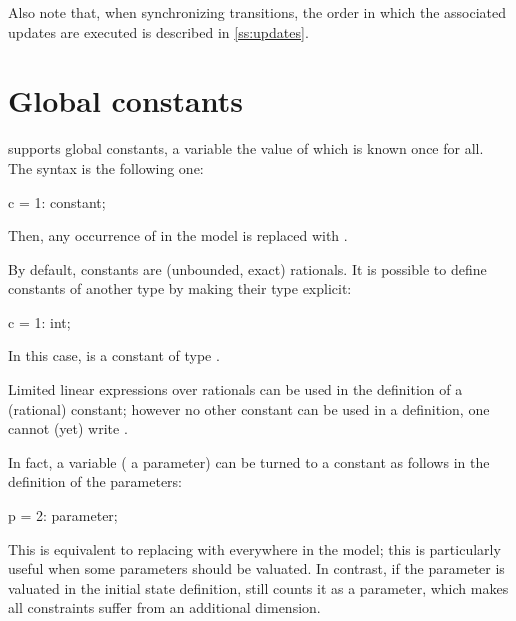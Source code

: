 Also note that, when synchronizing transitions, the order in which the associated updates are executed is described in \cref{ss:updates}.


\section{Global constants}

\imitator{} supports global constants, \ie{} a variable the value of which is known once for all.
The syntax is the following one:

\begin{IMITATORmodel}
c = 1: constant;
\end{IMITATORmodel}

Then, any occurrence of  in the model is replaced with .

By default, constants are (unbounded, exact) rationals.
It is possible to define constants of another type by making their type explicit:

\begin{IMITATORmodel}
c = 1: int;
\end{IMITATORmodel}

In this case,  is a constant of type .

Limited linear expressions over rationals can be used in the definition of a (rational) constant; however no other constant can be used in a definition, \ie{} one cannot (yet) write .


\begin{hint}
	In fact, a variable (\eg{} a parameter) can be turned to a constant as follows in the definition of the parameters:

\begin{IMITATORmodel}
p = 2: parameter;
\end{IMITATORmodel}

	This is equivalent to replacing  with  everywhere in the model; this is particularly useful when some parameters should be valuated.
	In contrast, if the parameter is valuated in the initial state definition, \imitator{} still counts it as a parameter, which makes all constraints suffer from an additional dimension.
\end{hint}






